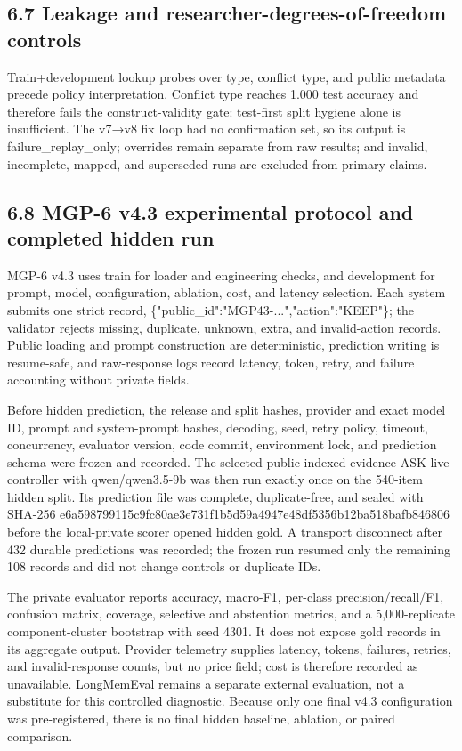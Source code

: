 \subsection{6.7 Leakage and researcher-degrees-of-freedom
controls}\label{leakage-and-researcher-degrees-of-freedom-controls}

Train+development lookup probes over type, conflict type, and public
metadata precede policy interpretation. Conflict type reaches 1.000 test
accuracy and therefore fails the construct-validity gate: test-first
split hygiene alone is insufficient. The v7→v8 fix loop had no
confirmation set, so its output is failure\_replay\_only; overrides
remain separate from raw results; and invalid, incomplete, mapped, and
superseded runs are excluded from primary claims.

\subsection{6.8 MGP-6 v4.3 experimental protocol and completed hidden
run}\label{mgp-6-v4.3-experimental-protocol-and-completed-hidden-run}

MGP-6 v4.3 uses train for loader and engineering checks, and development
for prompt, model, configuration, ablation, cost, and latency selection.
Each system submits one strict record,
\{"public\_id":"MGP43-...","action":"KEEP"\}; the validator rejects
missing, duplicate, unknown, extra, and invalid-action records. Public
loading and prompt construction are deterministic, prediction writing is
resume-safe, and raw-response logs record latency, token, retry, and
failure accounting without private fields.

Before hidden prediction, the release and split hashes, provider and
exact model ID, prompt and system-prompt hashes, decoding, seed, retry
policy, timeout, concurrency, evaluator version, code commit,
environment lock, and prediction schema were frozen and recorded. The
selected public-indexed-evidence ASK live controller with
qwen/qwen3.5-9b was then run exactly once on the 540-item hidden split.
Its prediction file was complete, duplicate-free, and sealed with
SHA-256 e6a598799115c9fc80ae3e731f1b5d59a4947e48df5356b12ba518bafb846806
before the local-private scorer opened hidden gold. A transport
disconnect after 432 durable predictions was recorded; the frozen run
resumed only the remaining 108 records and did not change controls or
duplicate IDs.

The private evaluator reports accuracy, macro-F1, per-class
precision/recall/F1, confusion matrix, coverage, selective and
abstention metrics, and a 5,000-replicate component-cluster bootstrap
with seed 4301. It does not expose gold records in its aggregate output.
Provider telemetry supplies latency, tokens, failures, retries, and
invalid-response counts, but no price field; cost is therefore recorded
as unavailable. LongMemEval remains a separate external evaluation, not
a substitute for this controlled diagnostic. Because only one final v4.3
configuration was pre-registered, there is no final hidden baseline,
ablation, or paired comparison.

